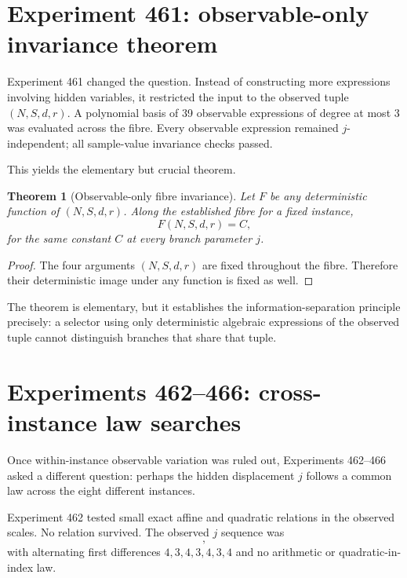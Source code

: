 \documentclass[11pt,a4paper]{article}
\newtheorem{theorem}{Theorem}[section]
\begin{document}
\section{Experiment 461: observable-only invariance theorem}

Experiment 461 changed the question. Instead of constructing more expressions involving hidden variables, it restricted the input to the observed tuple $(N,S,d,r)$. A polynomial basis of 39 observable expressions of degree at most 3 was evaluated across the fibre. Every observable expression remained $j$-independent; all sample-value invariance checks passed.

This yields the elementary but crucial theorem.

\begin{theorem}[Observable-only fibre invariance]
Let $F$ be any deterministic function of $(N,S,d,r)$. Along the established fibre for a fixed instance,
\begin{equation}
F(N,S,d,r)=C,
\end{equation}
for the same constant $C$ at every branch parameter $j$.
\end{theorem}

\begin{proof}
The four arguments $(N,S,d,r)$ are fixed throughout the fibre. Therefore their deterministic image under any function is fixed as well.
\end{proof}

The theorem is elementary, but it establishes the information-separation principle precisely: a selector using only deterministic algebraic expressions of the observed tuple cannot distinguish branches that share that tuple.

\section{Experiments 462--466: cross-instance law searches}

Once within-instance observable variation was ruled out, Experiments 462--466 asked a different question: perhaps the hidden displacement $j$ follows a common law across the eight different instances.

Experiment 462 tested small exact affine and quadratic relations in the observed scales. No relation survived. The observed $j$ sequence was
\begin{equation}
[5,9,12,16,19,23,26,30],
\end{equation}
with alternating first differences $4,3,4,3,4,3,4$ and no arithmetic or quadratic-in-index law.
\end{document}

